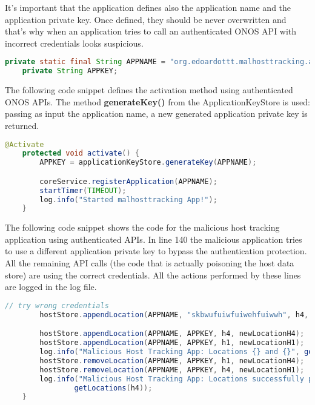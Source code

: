 \documentclass[a4paper,10pt]{memoir}
\begin{document}
It's important that the application defines also the application name and the application private key. Once defined, they should be never overwritten and that's why when an application tries to call an authenticated ONOS API with incorrect credentials looks suspicious.
\begin{lstlisting}[language=java,firstnumber=74]
    private static final String APPNAME = "org.edoardottt.malhosttracking.app";
    private String APPKEY;
\end{lstlisting}

The following code snippet defines the activation method using authenticated ONOS APIs. The method \textbf{generateKey()} from the ApplicationKeyStore is used: passing as input the application name, a new generated application private key is returned.
\begin{lstlisting}[language=java,firstnumber=93]
    @Activate
    protected void activate() {
        APPKEY = applicationKeyStore.generateKey(APPNAME);

        coreService.registerApplication(APPNAME);
        startTimer(TIMEOUT);
        log.info("Started malhosttracking App!");
    }
\end{lstlisting}

The following code snippet shows the code for the malicious host tracking application using authenticated APIs. In line 140 the malicious application tries to use a different application private key to bypass the authentication protection. All the remaining API calls (the code that is actually poisoning the host data store) are using the correct credentials. All the actions performed by these lines are logged in the log file.
\begin{lstlisting}[language=java,firstnumber=139]
        // try wrong credentials
        hostStore.appendLocation(APPNAME, "skbwufuiwfuiwehfuiwwh", h4, newLocationH4);

        hostStore.appendLocation(APPNAME, APPKEY, h4, newLocationH4);
        hostStore.appendLocation(APPNAME, APPKEY, h1, newLocationH1);
        log.info("Malicious Host Tracking App: Locations {} and {}", getLocations(h1), getLocations(h4));
        hostStore.removeLocation(APPNAME, APPKEY, h1, newLocationH4);
        hostStore.removeLocation(APPNAME, APPKEY, h4, newLocationH1);
        log.info("Malicious Host Tracking App: Locations successfully poisoned: {} and {}", getLocations(h1),
                getLocations(h4));
    }
\end{lstlisting}
\end{document}
